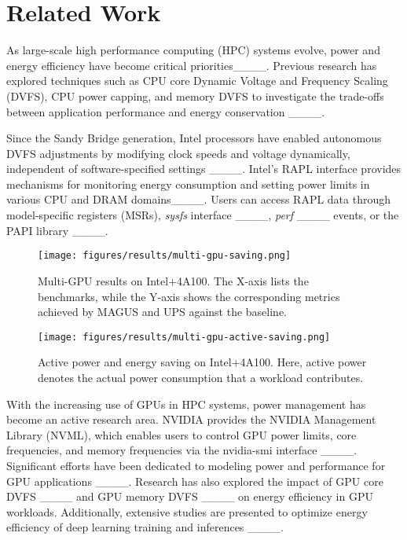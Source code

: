 \section{Related Work}
As large-scale high performance computing (HPC) systems evolve, power and energy efficiency have become critical priorities____. 
Previous research has explored techniques such as CPU core Dynamic Voltage and Frequency Scaling (DVFS), CPU power capping, and memory DVFS to investigate the trade-offs between application performance and energy conservation ____. 

Since the Sandy Bridge generation, Intel processors have enabled autonomous DVFS adjustments by modifying clock speeds and voltage dynamically, independent of software-specified settings ____. Intel’s RAPL interface provides mechanisms for monitoring energy consumption and setting power limits in various CPU and DRAM domains____. Users can access RAPL data through model-specific registers (MSRs), \textit{sysfs} interface ____, \textit{perf} ____ events, or the PAPI library ____. 

\begin{figure}
    \centering
    \texttt{[image: figures/results/multi-gpu-saving.png]}
    \caption{Multi-GPU results on Intel+4A100. The X-axis lists the benchmarks, while the Y-axis shows the corresponding metrics achieved by MAGUS and UPS against the baseline.}
    \label{fig:saving_multi_gpu}
    \vspace{-10pt}
\end{figure}

\begin{figure}
    \centering
    \texttt{[image: figures/results/multi-gpu-active-saving.png]}
    \caption{Active power and energy saving on Intel+4A100. Here, active power denotes the actual power consumption that a workload contributes.}
    \label{fig:multi-gpu-active-saving}
    \vspace{-5pt}
\end{figure}

With the increasing use of GPUs in HPC systems, power management has become an active research area. NVIDIA provides the NVIDIA Management Library (NVML), which enables users to control GPU power limits, core frequencies, and memory frequencies via the nvidia-smi interface ____. Significant efforts have been dedicated to modeling power and performance for GPU applications ____. Research has also explored the impact of GPU core DVFS ____ and GPU memory DVFS ____ on energy efficiency in GPU workloads. 
Additionally, extensive studies are presented to optimize energy efficiency of deep learning training and inferences ____. 

